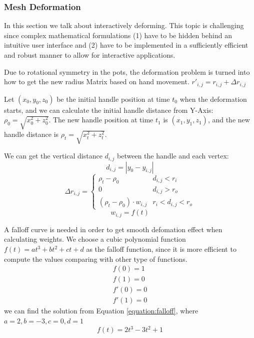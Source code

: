 \subsubsection{Mesh Deformation}
\label{sec:4.2.3}
In this section we talk about interactively deforming. This topic is challenging since complex mathematical formulations (1) have to be hidden behind an intuitive user interface and (2) have to be implemented in a sufficiently efficient and robust manner to allow for interactive applications.\cite{botsch2010polygon}

Due to rotational symmetry in the pots, the deformation problem is turned into how to get the new radius Matrix based on hand movement. $r'_{i,j} = r_{i,j} + \Delta r_{i,j}$

Let $(x_{0},y_{0},z_{0})$ be the initial handle position at time $t_{0}$ when the deformation starts, and we can calculate the initial handle distance from Y-Axis: $\rho_{0} = \sqrt{x_{0}^2 + z_{0}^2}$. The new handle position at time $t_{1}$ is $(x_{1},y_{1},z_{1})$, and the new handle distance is $\rho_{t} = \sqrt{x_{t}^2 + z_{t}^2}$.

We can get the vertical distance $d_{i,j}$ between the handle and each vertex:
\begin{equation}
d_{i,j} = |y_{0} - y_{i,j}|
\end{equation}
\begin{equation}
\Delta r_{i,j} = \begin{cases}
\rho_{t} - \rho_{0} &  d_{i,j} < r_{i} \\
0 &  d_{i,j} > r_{o} \\
(\rho_{t} - \rho_{0}) \cdot w_{i,j} &  r_{i} < d_{i,j} < r_{o}
\end{cases}
\end{equation}
\begin{equation}
w_{i,j} = f(t)
\end{equation}

A falloff curve is needed in order to get smooth defomation effect when calculating weights. We choose a cubic polynomial function $f(t) = at^3 + bt^2 + ct + d$ as the falloff function, since it is more efficient to compute the values comparing with other type of functions.
\begin{equation}
\begin{aligned}
\label{equation:falloff}
f(0) = 1 \\
f(1) = 0 \\ 
f'(0) = 0 \\
f'(1) = 0
\end{aligned}
\end{equation}
we can find the solution from Equation \ref{equation:falloff}, where 
$a = 2, b = -3, c = 0, d = 1$
\begin{equation}
f(t) = 2t^3 - 3t^2 + 1
\end{equation}


